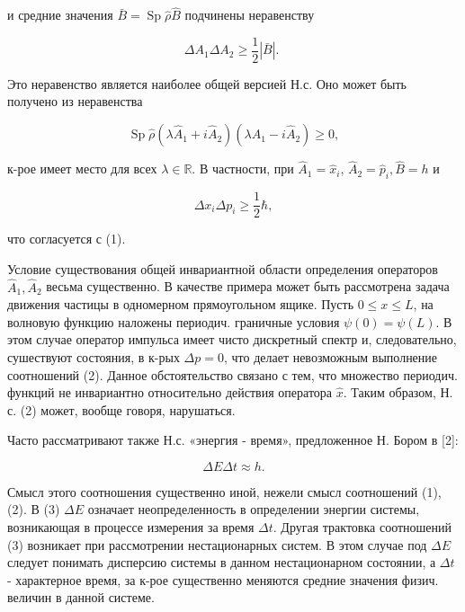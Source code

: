 \documentclass[10pt]{article}
\begin{document}
и средние значения $\bar{B}=\operatorname{Sp} \hat{\rho} \hat{B}$ подчинены неравенству



\[

\Delta A_{1} \Delta A_{2} \geqslant \frac{1}{2}|\bar{B}| \text {. }

\]



Это неравенство является наиболее общей версией Н.с. Оно может быть получено из неравенства



\[

\operatorname{Sp} \hat{\rho}\left(\lambda \hat{A}_{1}+i \hat{A}_{2}\right)\left(\lambda \hat{A}_{1}-i \hat{A}_{2}\right) \geqslant 0,

\]



к-рое имеет место для всех $\lambda \in \mathbb{R}$. В частности, при $\hat{A}_{1}=\hat{x}_{i}$, $\hat{A}_{2}=\hat{p}_{i}, \hat{B}=h$ и



\[

\Delta x_{i} \Delta p_{i} \geqslant \frac{1}{2} \hbar,

\]



что согласуется с (1).



Условие существования общей инвариантной области определения операторов $\hat{A}_{1}, \hat{A}_{2}$ весьма существенно. В качестве примера может быть рассмотрена задача движения частицы в одномерном прямоугольном ящике. Пусть $0 \leqslant x \leqslant L$, на волновую функцию наложены периодич. граничные условия $\psi(0)=\psi(L)$. В этом случае оператор импульса имеет чисто дискретный спектр и, следовательно, сушествуют состояния, в к-рых $\Delta p=0$, что делает невозможным выполнение соотношений (2). Данное обстоятельство связано с тем, что множество периодич. функций не инвариантно относительно действия оператора $\hat{x}$. Таким образом, Н. с. (2) может, вообще говоря, нарушаться.



Часто рассматривают также Н.с. «энергия - время», предложенное Н. Бором в [2]:



\[

\Delta E \Delta t \approx h .

\]



Смысл этого соотношения существенно иной, нежели смысл соотношений (1), (2). В (3) $\Delta E$ означает неопределенность в определении энергии системы, возникающая в процессе измерения за время $\Delta t$. Другая трактовка соотношений (3) возникает при рассмотрении нестационарных систем. В этом случае под $\Delta E$ следует понимать дисперсию системы в данном нестационарном состоянии, а $\Delta t$ - характерное время, за к-рое существенно меняются средние значения физич. величин в данной системе.
\end{document}
